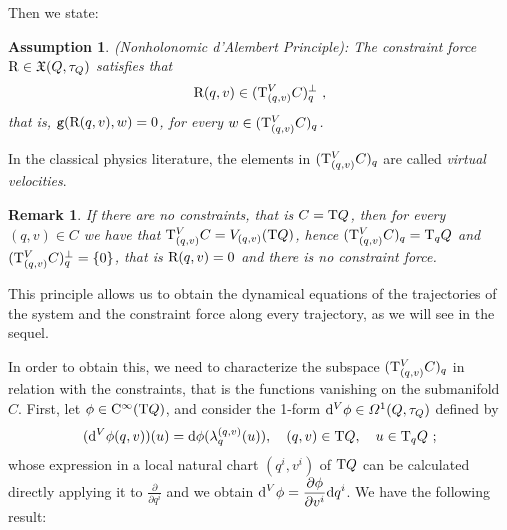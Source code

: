 \documentclass[12pt]{report}
\newtheorem{remark}[teor]{Remark}
\newtheorem{assump}[teor]{Assumption}
\def\dst{\displaystyle}
\def\derpar#1#2{\frac{\partial{#1}}{\partial{#2}}}
\def\vf{\mathfrak X}
\def\df{{\mit\Omega}}
\def\d{{\rm d}}
\def\Tan{{\rm T}}
\def\Cinfty{{\rm C}^\infty}
\begin{document}
Then we state:

\begin{assump}
{\rm (Nonholonomic d'Alembert Principle}):
The constraint force ${\rm R}\in\vf (Q,\tau_Q)$ satisfies that
$$
{\rm R}(q,v)\in(\Tan^V_{(q,v)}C)^\perp_q \ ,
$$
that is, ${\tt g}({\rm R}(q,v),w)=0$, for every $w\in (\Tan^V_{(q,v)}C)_q$.
\end{assump}

In the classical physics literature, the elements in $(\Tan^V_{(q,v)}C)_q$ are called {\sl virtual velocities}. 

\begin{remark}{\rm  If there are no constraints, that is $C=\Tan Q$, then for every $(q,v)\in C$ we have that $\Tan_{(q,v)}^VC=V_{(q,v)}(\Tan Q)$, hence $(\Tan^V_{(q,v)}C)_q=\Tan_{q}Q$ and $(\Tan^V_{(q,v)}C)^\perp_q=\{0\}$, that is ${\rm R}(q,v)=0$ and there is no constraint force.
}\end{remark}

\bigskip
This principle allows us to obtain the dynamical equations of the trajectories of the system and the constraint force along every trajectory, as we will see in the sequel. 

In order to obtain this, we need to characterize the subspace $(\Tan^V_{(q,v)}C)_q$ in relation with the constraints, that is the functions vanishing on the submanifold $C$.
First, let $\phi\in\Cinfty (\Tan Q)$, and consider the 1-form $\d^V\phi\in\df^1(Q,\tau_Q)$ defined by
$$
(\d^V\phi(q,v))(u)=\d\phi (\lambda_q^{(q,v)}(u))
 ,  \quad (q,v)\in\Tan Q, \quad u\in\Tan_qQ \ ;
$$
whose expression in a local natural chart $(q^i,v^i)$ of $\Tan Q$ can be calculated directly applying it to  $\dst \derpar{}{q^i}$ and we obtain \(\dst\d^V\phi=\derpar{\phi}{v^i}\d q^i\). We have the following result:
\end{document}
